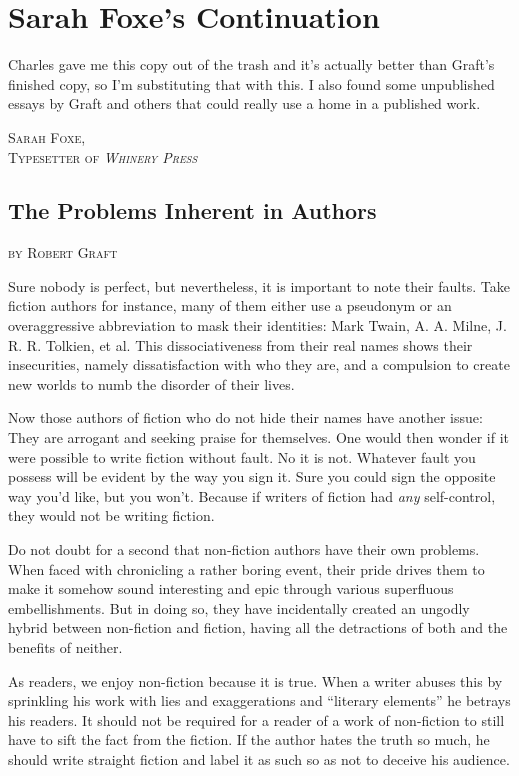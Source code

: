 \chapter{Sarah Foxe's Continuation}
Charles gave me this copy out of the trash and it's actually better than Graft's finished copy, so I'm substituting that with this.
I also found some unpublished essays by Graft and others that could really use a home in a published work.
\begin{flushright}
\textsc{
Sarah Foxe,\\
Typesetter of \emph{Whinery Press}}
\end{flushright}

\section{The Problems Inherent in Authors}
\begin{flushright}
\textsc{
by Robert Graft}
\end{flushright}

Sure nobody is perfect, but nevertheless, it is important to note their faults.
Take fiction authors for instance, many of them either use a pseudonym or an overaggressive abbreviation to mask their identities: Mark Twain, A. A. Milne, J. R. R. Tolkien, et al.
This dissociativeness from their real names shows their insecurities, namely dissatisfaction with who they are, and a compulsion to create new worlds to numb the disorder of their lives.

Now those authors of fiction who do not hide their names have another issue: They are arrogant and seeking praise for themselves.
One would then wonder if it were possible to write fiction without fault. No it is not. Whatever fault you possess will be evident by the way you sign it.
Sure you could sign the opposite way you'd like, but you won't. Because if writers of fiction had \emph{any} self-control, they would not be writing fiction.

Do not doubt for a second that non-fiction authors have their own problems. When faced with chronicling a rather boring event, their pride drives them to make it somehow sound interesting and epic through various superfluous embellishments. But in doing so, they have incidentally created an ungodly hybrid between non-fiction and fiction, having all the detractions of both and the benefits of neither.

As readers, we enjoy non-fiction because it is true. When a writer abuses this by sprinkling his work with lies and exaggerations and ``literary elements'' he betrays his readers.
It should not be required for a reader of a work of non-fiction to still have to sift the fact from the fiction.
If the author hates the truth so much, he should write straight fiction and label it as such so as not to deceive his audience.

